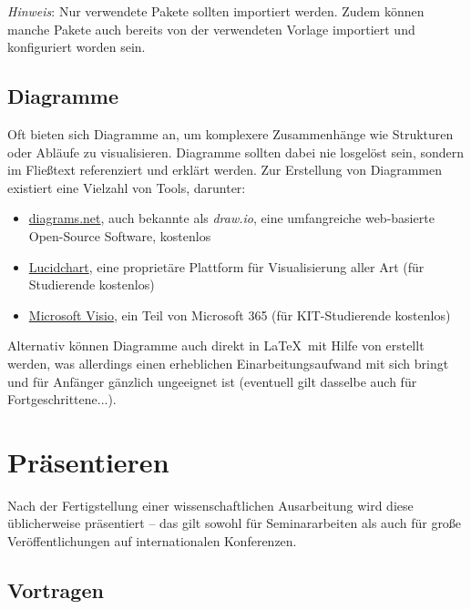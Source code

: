 \noindent
\emph{Hinweis}: Nur verwendete Pakete sollten importiert werden.
Zudem können manche Pakete auch bereits von der verwendeten Vorlage importiert und konfiguriert worden sein.

\subsection{Diagramme}%
\label{sec:Schreiben:Diagramme}

Oft bieten sich Diagramme an, um komplexere Zusammenhänge wie Strukturen oder Abläufe zu visualisieren. Diagramme sollten dabei nie losgelöst sein, sondern im Fließtext referenziert und erklärt werden. Zur Erstellung von Diagrammen existiert eine Vielzahl von Tools, darunter:

\smallskip
\begin{itemize}[label={\symbolTool}]
    \item \href{https://www.diagrams.net//}{diagrams.net}, auch bekannte als \emph{draw.io}, eine umfangreiche web-basierte Open-Source Software, kostenlos
    \item \href{https://www.lucidchart.com/}{Lucidchart}, eine proprietäre Plattform für Visualisierung aller Art (für Studierende kostenlos)
    \item \href{https://www.microsoft.com/de-de/microsoft-365/visio}{Microsoft Visio}, ein Teil von Microsoft 365 (für KIT-Studierende kostenlos)
\end{itemize}
\smallskip

\noindent
Alternativ können Diagramme auch direkt in \LaTeX\ mit Hilfe von  erstellt werden, was allerdings einen erheblichen Einarbeitungsaufwand mit sich bringt und für Anfänger gänzlich ungeeignet ist (eventuell gilt dasselbe auch für Fortgeschrittene...).

\section{Präsentieren}%
\label{sec:Praesentieren}

Nach der Fertigstellung einer wissenschaftlichen Ausarbeitung wird diese üblicherweise präsentiert -- das gilt sowohl für Seminararbeiten als auch für große Veröffentlichungen auf internationalen Konferenzen.

\subsection{Vortragen}%
\label{sec:Praesentieren:Vortragen}

